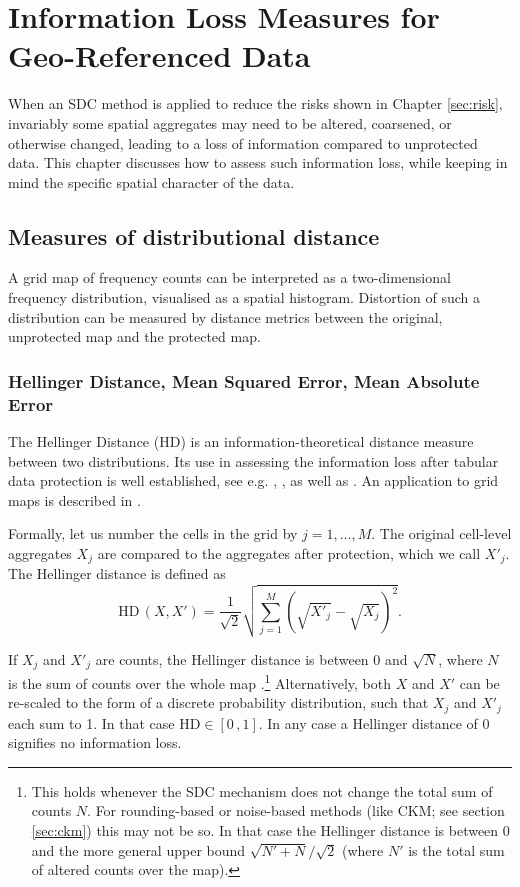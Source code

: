 \chapter{Information Loss Measures for Geo-Referenced Data} \label{sec:util}

When an SDC method is applied to reduce the risks shown in Chapter \ref{sec:risk}, invariably some spatial aggregates may need to be altered, coarsened, or otherwise changed, leading to a loss of information compared to unprotected data. This chapter discusses how to assess such information loss, while keeping in mind the specific spatial character of the data.

\section{Measures of distributional distance} \label{sec:util_DD}

A grid map of frequency counts can be interpreted as a two-dimensional frequency distribution, visualised as a spatial histogram. Distortion of such a distribution can be measured by distance metrics between the original, unprotected map and the protected map.

\subsection{Hellinger Distance, Mean Squared Error, Mean Absolute Error} \label{sec:util_DD_hd}

The Hellinger Distance (HD) is an information-theoretical distance measure between two distributions. Its use in assessing the information loss after tabular data protection is well established, see e.g. \cite{ShlomoEtAl2015}, \cite{AntalEtAl2017}, \cite{ShlomoYoung2006} as well as \citet[4.7.2]{HundepoolEtAl2024}. An application to grid maps is described in \cite{GussenbauerEtAl2023}.

Formally, let us number the cells in the grid by $j = 1, \dots, M$. The original cell-level aggregates $X_j$ are compared to the aggregates after protection, which we call $X'_j$.
The Hellinger distance is defined as
\begin{equation} \label{eq:util_hd}
\mathrm{HD}\,(X, X') = \frac{1}{\sqrt{2}} \sqrt{\sum_{j=1}^M \left (\sqrt{X'_j} - \sqrt{X_j} \right )^2}.
\end{equation}

If $X_j$ and $X'_j$ are counts, the Hellinger distance is between 0 and $\sqrt{N}$, where $N$ is the sum of counts over the whole map \citep{ShlomoEtAl2015}.\footnote{
    This holds whenever the SDC mechanism does not change the total sum of counts $N$. For rounding-based or noise-based methods (like CKM; see section \ref{sec:ckm}) this may not be so. In that case the Hellinger distance is between 0 and the more general upper bound $\sqrt{N' + N} / \sqrt{2}$ (where $N'$ is the total sum of altered counts over the map).
} Alternatively, both $X$ and $X'$ can be re-scaled to the form of a discrete probability distribution, such that $X_j$ and $X'_j$ each sum to 1. In that case $\mathrm{HD} \in [0 \,, 1]$.
In any case a Hellinger distance of 0 signifies no information loss.

